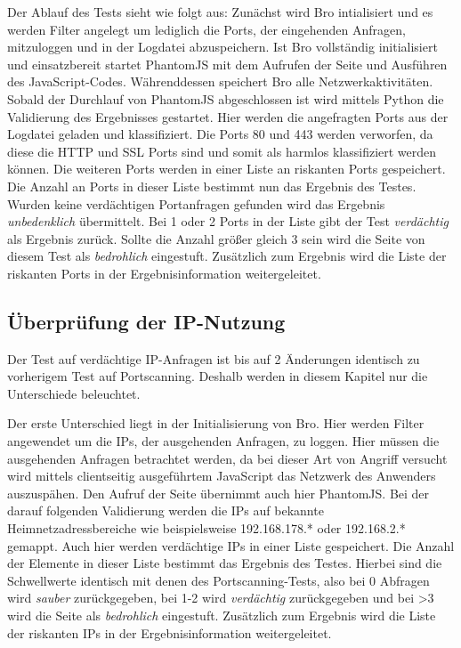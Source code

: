 Der Ablauf des Tests sieht wie folgt aus: Zunächst wird Bro intialisiert und es werden Filter
angelegt um lediglich die Ports, der eingehenden Anfragen, mitzuloggen und in der Logdatei
abzuspeichern. Ist Bro vollständig initialisiert und einsatzbereit startet PhantomJS mit dem
Aufrufen der Seite und Ausführen des JavaScript-Codes. Währenddessen speichert Bro alle
Netzwerkaktivitäten. Sobald der Durchlauf von PhantomJS abgeschlossen ist wird mittels Python die
Validierung des Ergebnisses gestartet. Hier werden die angefragten Ports aus der Logdatei geladen
und klassifiziert. Die Ports 80 und 443 werden verworfen, da diese die \acs{HTTP} und \acs{SSL}
Ports sind und somit als harmlos klassifiziert werden können. Die weiteren Ports werden in einer Liste an riskanten Ports gespeichert. Die Anzahl an Ports in dieser Liste bestimmt nun das Ergebnis des Testes. Wurden keine verdächtigen Portanfragen gefunden wird das Ergebnis \textit{unbedenklich} übermittelt. Bei 1 oder 2 Ports in der Liste gibt der Test \textit{verdächtig} als Ergebnis zurück. Sollte die Anzahl größer gleich 3 sein wird die Seite von diesem Test als \textit{bedrohlich} eingestuft. Zusätzlich zum Ergebnis wird die Liste der riskanten Ports in der Ergebnisinformation weitergeleitet.

\subsection{Überprüfung der IP-Nutzung}
Der Test auf verdächtige IP-Anfragen ist bis auf 2 Änderungen identisch zu vorherigem Test auf Portscanning. Deshalb werden in diesem Kapitel nur die Unterschiede beleuchtet.

Der erste Unterschied liegt in der Initialisierung von Bro. Hier werden Filter angewendet um die IPs, der ausgehenden Anfragen, zu loggen. Hier müssen die ausgehenden Anfragen betrachtet werden, da bei dieser Art von Angriff versucht wird mittels clientseitig ausgeführtem JavaScript das Netzwerk des Anwenders auszuspähen. Den Aufruf der Seite übernimmt auch hier PhantomJS. Bei der darauf folgenden Validierung werden die IPs auf bekannte Heimnetzadressbereiche wie beispielsweise 192.168.178.* oder 192.168.2.* gemappt. Auch hier werden verdächtige IPs in einer Liste gespeichert. Die Anzahl der Elemente in dieser Liste bestimmt das Ergebnis des Testes. Hierbei sind die Schwellwerte identisch mit denen des Portscanning-Tests, also bei 0 Abfragen wird \textit{sauber} zurückgegeben, bei 1-2 wird \textit{verdächtig} zurückgegeben und bei >3 wird die Seite als \textit{bedrohlich} eingestuft. Zusätzlich zum Ergebnis wird die Liste der riskanten IPs in der Ergebnisinformation weitergeleitet.

